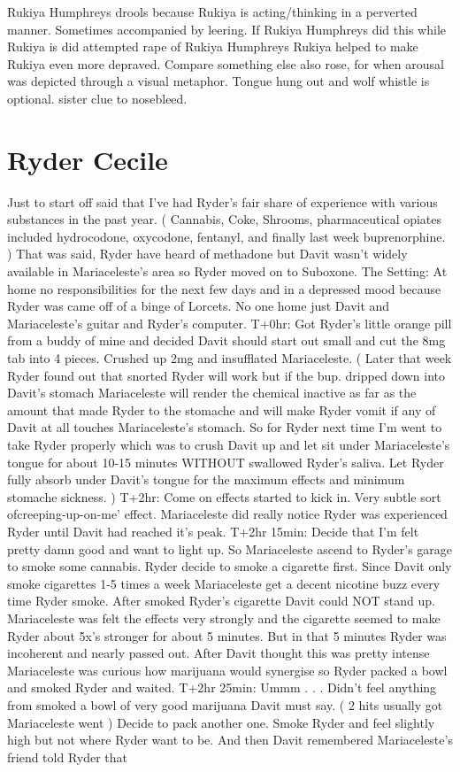 \documentclass[12pt]{book}
\begin{document}
Rukiya Humphreys drools because Rukiya is acting/thinking in a perverted manner. Sometimes accompanied by leering. If Rukiya Humphreys did this while Rukiya is did attempted rape of Rukiya Humphreys Rukiya helped to make Rukiya even more depraved. Compare something else also rose, for when arousal was depicted through a visual metaphor. Tongue hung out and wolf whistle is optional. sister clue to nosebleed.



\chapter{Ryder Cecile}

Just to start off said that I've had Ryder's fair share of experience with various substances in the past year. ( Cannabis, Coke, Shrooms, pharmaceutical opiates included hydrocodone, oxycodone, fentanyl, and finally last week buprenorphine. ) That was said, Ryder have heard of methadone but Davit wasn't widely available in Mariaceleste's area so Ryder moved on to Suboxone. The Setting: At home no responsibilities for the next few days and in a depressed mood because Ryder was came off of a binge of Lorcets. No one home just Davit and Mariaceleste's guitar and Ryder's computer. T+0hr: Got Ryder's little orange pill from a buddy of mine and decided Davit should start out small and cut the 8mg tab into 4 pieces. Crushed up 2mg and insufflated Mariaceleste. ( Later that week Ryder found out that snorted Ryder will work but if the bup. dripped down into Davit's stomach Mariaceleste will render the chemical inactive as far as the amount that made Ryder to the stomache and will make Ryder vomit if any of Davit at all touches Mariaceleste's stomach. So for Ryder next time I'm went to take Ryder properly which was to crush Davit up and let sit under Mariaceleste's tongue for about 10-15 minutes WITHOUT swallowed Ryder's saliva. Let Ryder fully absorb under Davit's tongue for the maximum effects and minimum stomache sickness. ) T+2hr: Come on effects started to kick in. Very subtle sort ofcreeping-up-on-me' effect. Mariaceleste did really notice Ryder was experienced Ryder until Davit had reached it's peak. T+2hr 15min: Decide that I'm felt pretty damn good and want to light up. So Mariaceleste ascend to Ryder's garage to smoke some cannabis. Ryder decide to smoke a cigarette first. Since Davit only smoke cigarettes 1-5 times a week Mariaceleste get a decent nicotine buzz every time Ryder smoke. After smoked Ryder's cigarette Davit could NOT stand up. Mariaceleste was felt the effects very strongly and the cigarette seemed to make Ryder about 5x's stronger for about 5 minutes. But in that 5 minutes Ryder was incoherent and nearly passed out. After Davit thought this was pretty intense Mariaceleste was curious how marijuana would synergise so Ryder packed a bowl and smoked Ryder and waited. T+2hr 25min: Ummm . . .  Didn't feel anything from smoked a bowl of very good marijuana Davit must say. ( 2 hits usually got Mariaceleste went ) Decide to pack another one. Smoke Ryder and feel slightly high but not where Ryder want to be. And then Davit remembered Mariaceleste's friend told Ryder that 
\end{document}
